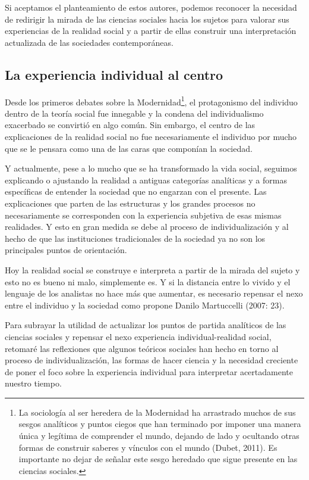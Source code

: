 \documentclass[
]{interact}
\begin{document}
Si aceptamos el planteamiento de estos autores, podemos reconocer la
necesidad de redirigir la mirada de las ciencias sociales hacia los
sujetos para valorar sus experiencias de la realidad social y a partir
de ellas construir una interpretación actualizada de las sociedades
contemporáneas.

\subsection{La experiencia individual al
centro}\label{la-experiencia-individual-al-centro}

Desde los primeros debates sobre la Modernidad\footnote{La sociología al
  ser heredera de la Modernidad ha arrastrado muchos de sus sesgos
  analíticos y puntos ciegos que han terminado por imponer una manera
  única y legítima de comprender el mundo, dejando de lado y ocultando
  otras formas de construir saberes y vínculos con el mundo (Dubet,
  2011). Es importante no dejar de señalar este sesgo heredado que sigue
  presente en las ciencias sociales.}, el protagonismo del individuo
dentro de la teoría social fue innegable y la condena del individualismo
exacerbado se convirtió en algo común. Sin embargo, el centro de las
explicaciones de la realidad social no fue necesariamente el individuo
por mucho que se le pensara como una de las caras que componían la
sociedad.

Y actualmente, pese a lo mucho que se ha transformado la vida social,
seguimos explicando o ajustando la realidad a antiguas categorías
analíticas y a formas específicas de entender la sociedad que no
engarzan con el presente. Las explicaciones que parten de las
estructuras y los grandes procesos no necesariamente se corresponden con
la experiencia subjetiva de esas mismas realidades. Y esto en gran
medida se debe al proceso de individualización y al hecho de que las
instituciones tradicionales de la sociedad ya no son los principales
puntos de orientación.

Hoy la realidad social se construye e interpreta a partir de la mirada
del sujeto y esto no es bueno ni malo, simplemente es. Y si la distancia
entre lo vivido y el lenguaje de los analistas no hace más que aumentar,
es necesario repensar el nexo entre el individuo y la sociedad como
propone Danilo Martuccelli (2007: 23).

Para subrayar la utilidad de actualizar los puntos de partida analíticos
de las ciencias sociales y repensar el nexo experiencia
individual-realidad social, retomaré las reflexiones que algunos
teóricos sociales han hecho en torno al proceso de individualización,
las formas de hacer ciencia y la necesidad creciente de poner el foco
sobre la experiencia individual para interpretar acertadamente nuestro
tiempo.
\end{document}
